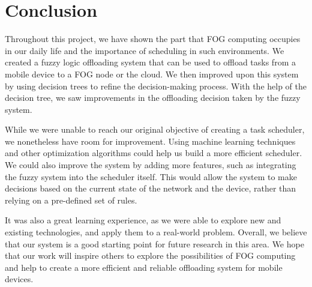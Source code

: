 \chapter{Conclusion}
\label{chap:conclusion}

Throughout this project, we have shown the part that FOG computing occupies in our daily life and the importance
of scheduling in such environments. We created a fuzzy logic offloading system that can be used to offload tasks
from a mobile device to a FOG node or the cloud. We then improved upon this system by using decision trees to
refine the decision-making process. With the help of the decision tree, we saw improvements in the offloading
decision taken by the fuzzy system.

While we were unable to reach our original objective of creating a task scheduler, we nonetheless have room for
improvement. Using machine learning techniques and other optimization algorithms could help us build a more
efficient scheduler. We could also improve the system by adding more features, such as integrating the fuzzy
system into the scheduler itself. This would allow the system to make decisions based on the current state of the
network and the device, rather than relying on a pre-defined set of rules.

It was also a great learning experience, as we were able to explore new and existing technologies, and apply them
to a real-world problem. Overall, we believe that our system is a good starting point for future research in this
area. We hope that our work will inspire others to explore the possibilities of FOG computing and help to create
a more efficient and reliable offloading system for mobile devices.
